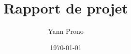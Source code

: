 \documentclass[a4paper,11pt, oneside]{book}
\title{Rapport de projet}
\author{Yann Prono}
\date{\today}
\begin{document}
	\begin{titlepage}
		
	\end{titlepage}

	\newpage

	\newpage\null\thispagestyle{empty}\newpage
	\setcounter{page}{1}

	

	\clearpage
\end{document}
